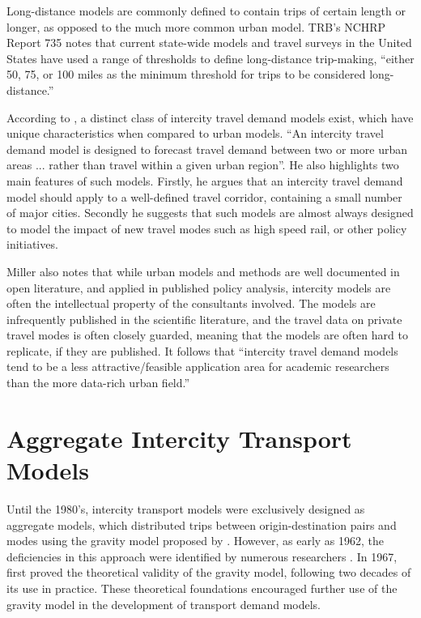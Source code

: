 Long-distance models are commonly defined to contain trips of certain length or longer, as opposed to the much more common urban model. TRB's NCHRP Report 735 notes that current state-wide models and travel surveys in the United States have used a range of thresholds to define long-distance trip-making, \enquote{either 50, 75, or 100 miles as the minimum threshold for trips to be considered long-distance.}\autocite{schif12}

According to \textcite{miller04}, a distinct class of intercity travel demand models exist, which have unique characteristics when compared to urban models. \enquote{An intercity travel demand model is designed to forecast travel demand between two or more urban areas ... rather than travel within a given urban region}. He also highlights two main features of such models. Firstly, he argues that an intercity travel demand model should apply to a well-defined travel corridor, containing a small number of major cities. Secondly he suggests that such models are almost always designed to model the impact of new travel modes such as high speed rail, or other policy initiatives.

Miller also notes that while urban models and methods are well documented in open literature, and applied in published policy analysis, intercity models are often the intellectual property of the consultants involved. The models are infrequently published in the scientific literature, and the travel data on private travel modes is often closely guarded, meaning that the models are often hard to replicate, if they are published. It follows that \enquote{intercity travel demand models tend to be a less attractive/feasible application area for academic researchers than the more data-rich urban field.} \parencite{miller04}

\section{Aggregate Intercity Transport Models}

Until the 1980’s, intercity transport models were exclusively designed as aggregate models, which distributed trips between origin-destination pairs and modes using the gravity model proposed by \autocite{casey55}. However, as early as 1962, the deficiencies in this approach were identified by numerous researchers \autocite*{OiSchu62, Warner62}. In 1967, \autocite{Wilson67} first proved the theoretical validity of the gravity model, following two decades of its use in practice. These theoretical foundations encouraged further use of the gravity model in the development of transport demand models. 

